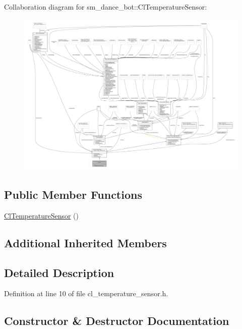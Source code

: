 Collaboration diagram for sm\+\_\+dance\+\_\+bot\+:\+:Cl\+Temperature\+Sensor\+:
\nopagebreak
\begin{figure}[H]
\begin{center}
\leavevmode
\includegraphics[width=350pt]{classsm__dance__bot_1_1ClTemperatureSensor__coll__graph}
\end{center}
\end{figure}
\subsection*{Public Member Functions}
\begin{DoxyCompactItemize}
\item 
\hyperlink{classsm__dance__bot_1_1ClTemperatureSensor_aa8e2c388e988018eb43d31de71b8ae91}{Cl\+Temperature\+Sensor} ()
\end{DoxyCompactItemize}
\subsection*{Additional Inherited Members}


\subsection{Detailed Description}


Definition at line 10 of file cl\+\_\+temperature\+\_\+sensor.\+h.



\subsection{Constructor \& Destructor Documentation}
